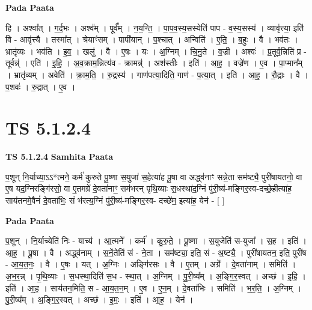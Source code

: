 \documentclass[17pt]{extarticle}
\begin{document}
\textbf{Pada Paata} \newline

हि । अश्वा᳚त् । ग॒र्द॒भः । अश्व᳚म् । पूर्व᳚म् । न॒य॒न्ति॒ । पा॒प॒व॒स्य॒सस्येति॑ पाप - व॒स्य॒सस्य॑ । व्यावृ॑त्त्या॒ इति॑ वि - आवृ॑त्त्यै । तस्मा᳚त् । श्रेयाꣳ॑सम् । पापी॑यान् । प॒श्चात् । अन्विति॑ । ए॒ति॒ । ब॒हुः । वै । भव॑तः । भ्रातृ॑व्यः । भव॑ति । इ॒व॒ । खलु॑ । वै । ए॒षः । यः । अ॒ग्निम् । चि॒नु॒ते । व॒ज्री । अश्वः॑ । प्र॒तूर्व॒न्निति॑ प्र - तूर्वन्न्॑ । एति॑ । इ॒हि॒ । अ॒व॒क्राम॒न्नित्य॑व - क्रामन्न्॑ । अश॑स्तीः । इति॑ । आ॒ह॒ । वज्रे॑ण । ए॒व । पा॒प्मान᳚म् । भ्रातृ॑व्यम् । अवेति॑ । क्रा॒म॒ति॒ । रु॒द्रस्य॑ । गाण॑पत्या॒दिति॒ गाण॑ - प॒त्या॒त् । इति॑ । आ॒ह॒ । रौ॒द्राः । वै । प॒शवः॑ । रु॒द्रात् । ए॒व ।  \newline




\section*{ TS 5.1.2.4 }

\textbf{TS 5.1.2.4 } \newline
\textbf{Samhita Paata} \newline

प॒शून् नि॒र्याच्या॒ऽऽ*त्मने॒ कर्म॑ कुरुते पू॒ष्णा स॒युजा॑ स॒हेत्या॑ह पू॒षा वा अद्ध्व॑नाꣳ सन्ने॒ता सम॑ष्ट्यै॒ पुरी॑षायतनो॒ वा ए॒ष यद॒ग्निरङ्गि॑रसो॒ वा ए॒तमग्रे॑ दे॒वता॑नाꣳ॒॒ सम॑भरन् पृथि॒व्याः स॒धस्था॑द॒ग्निं पु॑री॒ष्य॑-मङ्गिर॒स्व-दच्छे॒हीत्या॑ह॒ साय॑तनमे॒वैनं॑ दे॒वता॑भिः॒ सं भ॑रत्य॒ग्निं पु॑री॒ष्य॑-मङ्गिर॒स्व- दच्छे॑म॒ इत्या॑ह॒ येन॑ - [  ] \newline

\textbf{Pada Paata} \newline

प॒शून् । नि॒र्याच्येति॑ निः - याच्य॑ । आ॒त्मने᳚ । कर्म॑ । कु॒रु॒ते॒ । पू॒ष्णा । स॒युजेति॑ स-युजा᳚ । स॒ह । इति॑ । आ॒ह॒ । पू॒षा । वै । अद्ध्व॑नाम् । स॒नें॒तेति॑ सं - ने॒ता । सम॑ष्ट्या॒ इति॒ सं - अ॒ष्ट्यै॒ । पुरी॑षायतन॒ इति॒ पुरी॑ष - आ॒य॒त॒नः॒ । वै । ए॒षः । यत् । अ॒ग्निः । अङ्गि॑रसः । वै । ए॒तम् । अग्रे᳚ । दे॒वता॑नाम् । समिति॑ । अ॒भ॒र॒न्न् । पृ॒थि॒व्याः । स॒धस्था॒दिति॑ स॒ध - स्था॒त् । अ॒ग्निम् । पु॒री॒ष्य᳚म् । अ॒ङ्गि॒र॒स्वत् । अच्छ॑ । इ॒हि॒ । इति॑ । आ॒ह॒ । साय॑तन॒मिति॒ स - आ॒य॒त॒न॒म् । ए॒व । ए॒न॒म् । दे॒वता॑भिः । समिति॑ । भ॒र॒ति॒ । अ॒ग्निम् । पु॒री॒ष्य᳚म् । अ॒ङ्गि॒र॒स्वत् । अच्छ॑ । इ॒मः॒ । इति॑ । आ॒ह॒ । येन॑ ।  \newline
\end{document}
